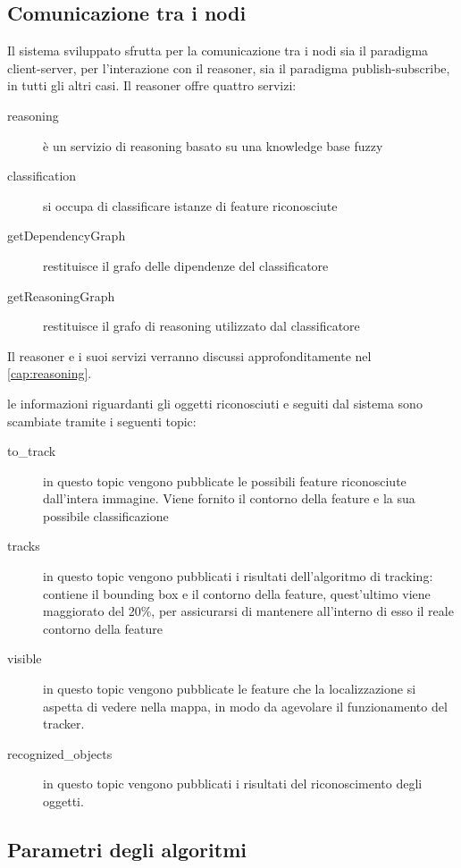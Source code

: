 \clearpage


\subsection{Comunicazione tra i nodi}

Il sistema sviluppato sfrutta per la comunicazione tra i nodi sia il paradigma client-server, per l'interazione con il reasoner, sia il paradigma publish-subscribe, in tutti gli altri casi.
Il reasoner offre quattro servizi:

\begin{description}
 \item [\/reasoning] è un  servizio di reasoning basato su una knowledge base fuzzy
 \item [\/classification] si occupa di classificare istanze di feature riconosciute
 \item [\/getDependencyGraph] restituisce il grafo delle dipendenze del classificatore
 \item [\/getReasoningGraph] restituisce il grafo di reasoning utilizzato dal classificatore
\end{description}

Il reasoner e i suoi servizi verranno discussi approfonditamente  nel \autoref{cap:reasoning}.

le informazioni riguardanti gli oggetti riconosciuti e seguiti dal sistema sono scambiate tramite i seguenti topic:

\begin{description}
 \item [\/to\_track] in questo topic vengono pubblicate le possibili feature riconosciute dall'intera immagine. Viene fornito il contorno della feature e la sua possibile classificazione
 \item [\/tracks] in questo topic vengono pubblicati i risultati dell'algoritmo di tracking: contiene il bounding box e il contorno della feature, quest'ultimo viene maggiorato del 20\%, per assicurarsi di mantenere all'interno di esso il reale contorno della feature
 \item [\/visible] in questo topic vengono pubblicate le feature che la localizzazione si aspetta di vedere nella mappa, in modo da agevolare il funzionamento del tracker.
 \item [\/recognized\_objects] in questo topic vengono pubblicati i risultati del riconoscimento degli oggetti.
\end{description}


\subsection{Parametri degli algoritmi}

